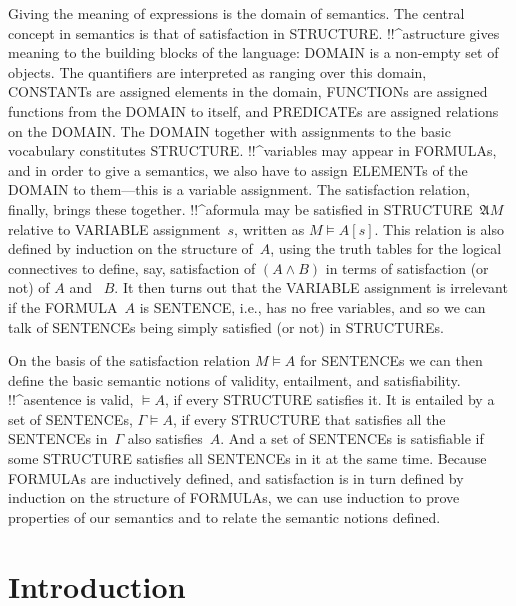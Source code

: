 \documentclass[10pt,a4paper]{article}
\newcommand*{\olup}[1]{\MakeUppercase{#1}}
\theoremstyle{plain}
\theoremstyle{definition}
\theoremstyle{remark}
\newcommand*{\olfileid}[3]{}
\newcommand*{\olsection}[1]{\section*{#1}}
\providecommand{\Entails}{\mathrel{\models}}
\providecommand{\Struct}{\ensuremath{\mathfrak{A}}}
\providecommand{\Sat}[2]{\ensuremath{#1 \models #2}}
\begin{document}
Giving the meaning of expressions is the domain of semantics.  The
central concept in semantics is that of satisfaction in
\olup{structure}. !!^a{structure} gives meaning to the building blocks
of the language: \olup{domain} is a non-empty set of objects. The
quantifiers are interpreted as ranging over this domain, \olup{constant}s
are assigned elements in the domain, \olup{function}s are assigned
functions from the \olup{domain} to itself, and \olup{predicate}s are
assigned relations on the \olup{domain}.  The \olup{domain} together with
assignments to the basic vocabulary constitutes \olup{structure}.
!!^{variable}s may appear in \olup{formula}s, and in order to give a
semantics, we also have to assign \olup{element}s of the \olup{domain} to
them---this is a variable assignment. The satisfaction relation,
finally, brings these together. !!^a{formula} may be satisfied in
\olup{structure}~$\Struct{M}$ relative to \olup{variable} assignment~$s$,
written as $\Sat{M}{A}[s]$. This relation is also defined by
induction on the structure of~$A$, using the truth tables for the
logical connectives to define, say, satisfaction of $(A \land B)$ in
terms of satisfaction (or not) of $A$ and ~$B$.  It then turns out
that the \olup{variable} assignment is irrelevant if the \olup{formula}~$A$
is \olup{sentence}, i.e., has no free variables, and so we can talk of
\olup{sentence}s being simply satisfied (or not) in \olup{structure}s.

On the basis of the satisfaction relation $\Sat{M}{A}$ for \olup{sentence}s
we can then define the basic semantic notions of validity, entailment,
and satisfiability. !!^a{sentence} is valid, $\Entails A$, if every
\olup{structure} satisfies it. It is entailed by a set of \olup{sentence}s,
$\Gamma \Entails A$, if every \olup{structure} that satisfies all the
\olup{sentence}s in~$\Gamma$ also satisfies~$A$. And a set of \olup{sentence}s
is satisfiable if some \olup{structure} satisfies all \olup{sentence}s in it
at the same time.  Because \olup{formula}s are inductively defined, and
satisfaction is in turn defined by induction on the structure of
\olup{formula}s, we can use induction to prove properties of our
semantics and to relate the semantic notions defined.





\olfileid{fol}{syn}{itx}

\olsection{Introduction}
\end{document}
